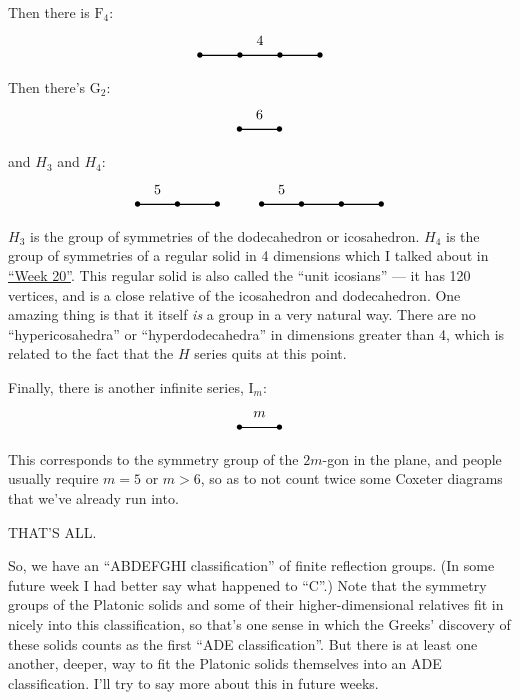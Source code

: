 \documentclass{article}
\begin{document}
Then there is \(\mathrm{F}_4\): \[
  \begin{tikzpicture}
    \draw[thick] (0,0) node{$\bullet$} to (1,0) node{$\bullet$} to node[label=above:{4}]{} (2,0) node{$\bullet$} to (3,0) node {$\bullet$};
  \end{tikzpicture}
\] Then there's \(\mathrm{G}_2\): \[
  \begin{tikzpicture}
    \draw[thick] (0,0) node{$\bullet$} to node[label=above:{6}]{} (1,0) node{$\bullet$};
  \end{tikzpicture}
\] and \(H_3\) and \(H_4\): \[
  \begin{tikzpicture}
    \draw[thick] (0,0) node{$\bullet$} to node[label=above:{5}]{} (1,0) node{$\bullet$} to (2,0) node{$\bullet$};
  \end{tikzpicture}
  \qquad
  \begin{tikzpicture}
  \draw[thick] (0,0) node{$\bullet$} to node[label=above:{5}]{} (1,0) node{$\bullet$} to (2,0) node{$\bullet$} to (3,0) node {$\bullet$};
\end{tikzpicture}
\] \(H_3\) is the group of symmetries of the dodecahedron or
icosahedron. \(H_4\) is the group of symmetries of a regular solid in 4
dimensions which I talked about in \protect\hyperlink{week20}{``Week
20''}. This regular solid is also called the ``unit icosians'' --- it
has 120 vertices, and is a close relative of the icosahedron and
dodecahedron. One amazing thing is that it itself \emph{is} a group in a
very natural way. There are no ``hypericosahedra'' or
``hyperdodecahedra'' in dimensions greater than 4, which is related to
the fact that the \(H\) series quits at this point.

Finally, there is another infinite series, \(\mathrm{I}_m\): \[
  \begin{tikzpicture}
    \draw[thick] (0,0) node{$\bullet$} to node[label=above:{$m$}]{} (1,0) node{$\bullet$};
  \end{tikzpicture}
\] This corresponds to the symmetry group of the \(2m\)-gon in the
plane, and people usually require \(m = 5\) or \(m > 6\), so as to not
count twice some Coxeter diagrams that we've already run into.

THAT'S ALL.

So, we have an ``ABDEFGHI classification'' of finite reflection groups.
(In some future week I had better say what happened to ``C''.) Note that
the symmetry groups of the Platonic solids and some of their
higher-dimensional relatives fit in nicely into this classification, so
that's one sense in which the Greeks' discovery of these solids counts
as the first ``ADE classification''. But there is at least one another,
deeper, way to fit the Platonic solids themselves into an ADE
classification. I'll try to say more about this in future weeks.
\end{document}
